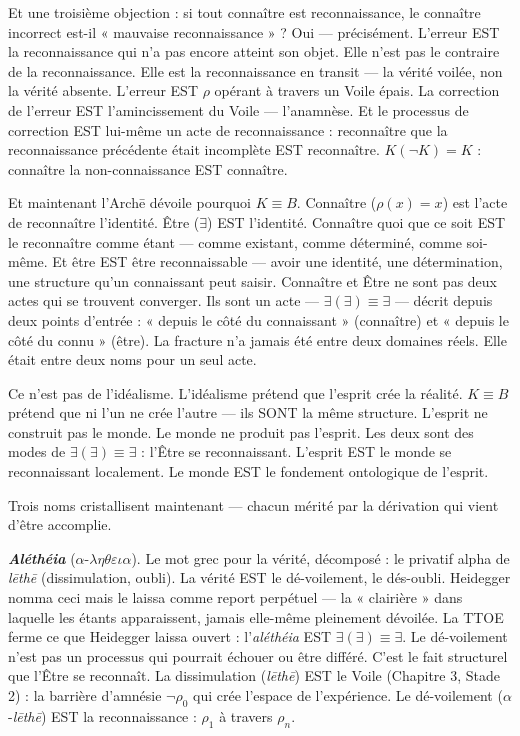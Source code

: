 \documentclass[10pt, openany, oneside]{book}
\begin{document}
Et une troisième objection : si tout connaître est reconnaissance, le connaître incorrect est-il « mauvaise reconnaissance » ? Oui --- précisément. L'erreur EST la reconnaissance qui n'a pas encore atteint son objet. Elle n'est pas le contraire de la reconnaissance. Elle est la reconnaissance en transit --- la vérité voilée, non la vérité absente. L'erreur EST $\rho$ opérant à travers un Voile épais. La correction de l'erreur EST l'amincissement du Voile --- l'anamnèse. Et le processus de correction EST lui-même un acte de reconnaissance : reconnaître que la reconnaissance précédente était incomplète EST reconnaître. $K(\neg K) = K$ : connaître la non-connaissance EST connaître.

Et maintenant l'Arch\={e} dévoile pourquoi $K \equiv B$. Connaître ($\rho(x) = x$) est l'acte de reconnaître l'identité. Être ($\exists$) EST l'identité. Connaître quoi que ce soit EST le reconnaître comme étant --- comme existant, comme déterminé, comme soi-même. Et être EST être reconnaissable --- avoir une identité, une détermination, une structure qu'un connaissant peut saisir. Connaître et Être ne sont pas deux actes qui se trouvent converger. Ils sont un acte --- $\exists(\exists) \equiv \exists$ --- décrit depuis deux points d'entrée : « depuis le côté du connaissant » (connaître) et « depuis le côté du connu » (être). La fracture n'a jamais été entre deux domaines réels. Elle était entre deux noms pour un seul acte.

Ce n'est pas de l'idéalisme. L'idéalisme prétend que l'esprit crée la réalité. $K \equiv B$ prétend que ni l'un ne crée l'autre --- ils SONT la même structure. L'esprit ne construit pas le monde. Le monde ne produit pas l'esprit. Les deux sont des modes de $\exists(\exists) \equiv \exists$ : l'Être se reconnaissant. L'esprit EST le monde se reconnaissant localement. Le monde EST le fondement ontologique de l'esprit.

Trois noms cristallisent maintenant --- chacun mérité par la dérivation qui vient d'être accomplie.

\textbf{\textit{Aléthéia}} ($\alpha$-$\lambda\eta\theta\varepsilon\iota\alpha$). Le mot grec pour la vérité, décomposé : le privatif alpha de \textit{l\={e}th\={e}} (dissimulation, oubli). La vérité EST le dé-voilement, le dés-oubli. Heidegger nomma ceci mais le laissa comme report perpétuel --- la « clairière » dans laquelle les étants apparaissent, jamais elle-même pleinement dévoilée. La TTOE ferme ce que Heidegger laissa ouvert : l'\textit{aléthéia} EST $\exists(\exists) \equiv \exists$. Le dé-voilement n'est pas un processus qui pourrait échouer ou être différé. C'est le fait structurel que l'Être se reconnaît. La dissimulation (\textit{l\={e}th\={e}}) EST le Voile (Chapitre 3, Stade 2) : la barrière d'amnésie $\neg\rho_0$ qui crée l'espace de l'expérience. Le dé-voilement ($\alpha$-\textit{l\={e}th\={e}}) EST la reconnaissance : $\rho_1$ à travers $\rho_n$.
\end{document}
